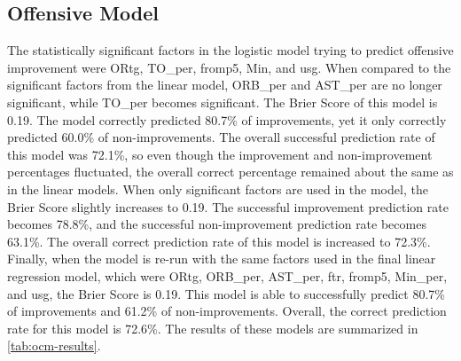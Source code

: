 \documentclass[12pt]{article}
\begin{document}
\subsection{Offensive Model}
\label{subsec:ocm}
The statistically significant factors in the logistic model trying to predict offensive improvement were ORtg, TO\_per, fromp5, Min\per, and usg. When compared to the significant factors from the  linear model, ORB\_per and AST\_per are no longer significant, while TO\_per becomes significant. The Brier Score of this model is 0.19. The model correctly predicted 80.7\% of improvements, yet it only correctly predicted 60.0\% of non-improvements. The overall successful prediction rate of this model was 72.1\%, so even though the improvement and non-improvement percentages fluctuated, the overall correct percentage remained about the same as in the linear models. When only significant factors are used in the model, the Brier Score slightly increases to 0.19. The successful improvement prediction rate becomes 78.8\%, and the successful non-improvement prediction rate becomes 63.1\%. The overall correct prediction rate of this model is increased to 72.3\%. Finally, when the model is re-run with the same factors used in the final linear regression model, which were ORtg, ORB\_per, AST\_per, ftr, fromp5, Min_per, and usg, the Brier Score is 0.19. This model is able to successfully predict 80.7\% of improvements and 61.2\% of non-improvements. Overall, the correct prediction rate for this model is 72.6\%. The results of these models are summarized in \autoref{tab:ocm-results}.

\begin{table}[t]
\centering
{}
\caption{Offensive Classification Model Evaluators}
\label{tab:ocm-results}
\end{table}
\end{document}
